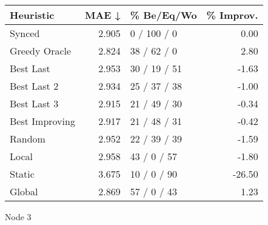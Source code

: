 \begin{tabular}{lrlr}
\toprule
\textbf{Heuristic} & \textbf{MAE ↓} & \textbf{\% Be/Eq/Wo} & \textbf{\% Improv.} \\
\midrule
            Synced &          2.905 &          0 / 100 / 0 &                0.00 \\
     Greedy Oracle &          2.824 &          38 / 62 / 0 &                2.80 \\
         Best Last &          2.953 &         30 / 19 / 51 &               -1.63 \\
       Best Last 2 &          2.934 &         25 / 37 / 38 &               -1.00 \\
       Best Last 3 &          2.915 &         21 / 49 / 30 &               -0.34 \\
    Best Improving &          2.917 &         21 / 48 / 31 &               -0.42 \\
            Random &          2.952 &         22 / 39 / 39 &               -1.59 \\
             Local &          2.958 &          43 / 0 / 57 &               -1.80 \\
            Static &          3.675 &          10 / 0 / 90 &              -26.50 \\
            Global &          2.869 &          57 / 0 / 43 &                1.23 \\
\bottomrule
\end{tabular}
\caption{Node 3}
\label{tab:hr_non_lr05_le1_bs4_3}
